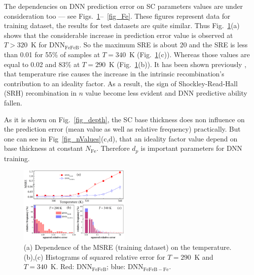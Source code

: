 \documentclass[a4paper,fleqn]{cas-sc}
\begin{document}
The dependencies on DNN prediction error on SC parameters values are under consideration too ---
see Figs.~\ref{fig_Temp}--~\ref{fig_Fe}.
These figures represent data for training dataset, the results for test datasets are quite similar.
Thus Fig.~\ref{fig_Temp}(a) shows that the considerable increase in prediction error value is observed at $T>320$~K for DNN$_\mathrm{FeFeB}$.
So the maximum SRE is about 20 and the SRE is less than 0.01 for 55\% of samples at $T=340$~K
(Fig.~\ref{fig_Temp}(c)).
Whereas those values are equal to 0.02 and 83\% at $T=290$~K (Fig.~\ref{fig_Temp}(b)).
It has been shown previously \cite{OlikhJPS}, that temperature rise causes the increase in
the intrinsic recombination's contribution to an ideality factor.
As a result, the sign of Shockley-Read-Hall (SRH) recombination in $n$ value become less evident
and DNN predictive ability fallen.


As it is shown on Fig.~\ref{fig_depth}, the SC base thickness does non influence on
the prediction error (mean value as well as relative frequency) practically.
But one can see in Fig~\ref{fig_nValues}(c,d), that an ideality factor value depend on
base thickness at constant $N_\mathrm{Fe}$.
Therefore $d_p$ is important parameters for DNN training.




\begin{figure}[tb]
\centering
\includegraphics[width=0.48\textwidth]{F4}
\caption{(a) Dependence of the MSRE (training dataset) on the temperature.
(b),(c) Histograms of squared relative error for $T=290$~K and $T=340$~K.
Red: DNN$_\mathrm{FeFeB}$; blue: DNN$_\mathrm{FeFeB-Fe}$.}
\label{fig_Temp}
\end{figure}
\end{document}
